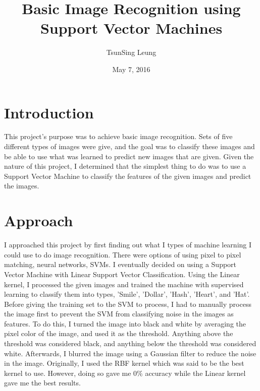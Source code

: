 \documentclass{article}
\title{Basic Image Recognition using Support Vector Machines}
\author{TsunSing Leung}
\date{May 7, 2016}
\begin{document}
\maketitle

\section{Introduction}
This project's purpose was to achieve basic image recognition. Sets of five different types of images were give, and the goal was to classify these images and be able to use what was learned to predict new images that are given. Given the nature of this project, I determined that the simplest thing to do was to use a Support Vector Machine to classify the features of the given images and predict the images.

\section{Approach}
I approached this project by first finding out what I types of machine learning I could use to do image recognition. There were options of using pixel to pixel matching, neural networks, SVMs. I eventually decided on using a Support Vector Machine with Linear Support Vector Classification. Using the Linear kernel, I processed the given images and trained the machine with supervised learning to classify them into types, 'Smile', 'Dollar', 'Hash', 'Heart', and 'Hat'. Before giving the training set to the SVM to process, I had to manually process the image first to prevent the SVM from classifying noise in the images as features. To do this, I turned the image into black and white by averaging the pixel color of the image, and used it as the threshold. Anything above the threshold was considered black, and anything below the threshold was considered white. Afterwards, I blurred the image using a Gaussian filter to reduce the noise in the image. Originally, I used the RBF kernel which was said to be the best kernel to use. However, doing so gave me 0\% accuracy while the Linear kernel gave me the best results. 
\end{document}
